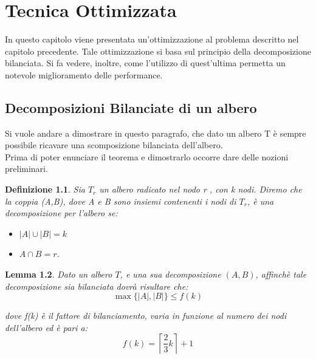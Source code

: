 \chapter{Tecnica Ottimizzata}

In questo capitolo viene presentata un'ottimizzazione al problema descritto nel capitolo precedente.
Tale ottimizzazione si basa sul principio della decomposizione bilanciata.
Si fa vedere, inoltre, come l'utilizzo di quest'ultima permetta un notevole miglioramento delle performance.

\section{Decomposizioni Bilanciate di un albero}
Si vuole andare a dimostrare in questo paragrafo, che dato un albero T \`e sempre possibile ricavare una scomposizione bilanciata dell'albero.
\\
Prima di poter enunciare il teorema e dimostrarlo occorre dare delle nozioni preliminari.

\newtheorem{definizione}{Definizione}[section]
\newtheorem{lemma}[definizione]{Lemma}
\begin{definizione}
	\label{definizioneDeco}
Sia $T_r$ un albero radicato nel nodo r , con k nodi.
Diremo che la coppia (A,B), dove  A e B sono insiemi contenenti i nodi di $T_r$, \`e una decomposizione per l'albero se:
\begin{itemize}
	\item $| A |\cup| B | = k$
	\item $A \cap B = r$.
\end{itemize}
\end{definizione}


\begin{lemma}
\label{lemmaDeco}
Dato un albero $ T $, e una sua decomposizione $ (A,B) $, affinch\`e tale decomposizione sia bilanciata dovr\`a risultare che:
\begin{equation*}
	\max{ \{|A| , |B| \} }  \le  f(k)
\end{equation*}


dove f(k) \`e il fattore di bilanciamento, varia in funzione al numero dei nodi dell'albero ed \`e pari a:
\begin{equation*}
f(k) = \left\lceil \frac{2}{3}  k  \right\rceil + 1
\end{equation*}
\end{lemma}\mbox{}

